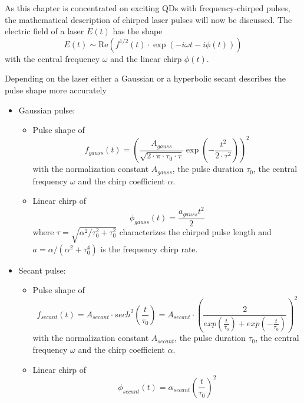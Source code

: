 As this chapter is concentrated on exciting \acp{QD} with frequency-chirped pulses, the mathematical description of chirped laser pulses will now be discussed. The electric field of a laser $E(t)$ has the shape
\begin{equation}
\label{eq:electric-field-laser}
E(t) \sim \mathrm{Re}\left(f^{1/2}(t) \cdot \exp\left(-i \omega t - i \phi(t)\right)\right)
\end{equation}
with the central frequency $\omega$ and the linear chirp $\phi(t)$.

Depending on the laser either a Gaussian or a hyperbolic secant describes the pulse shape more accurately~\cite{glassl_biexciton_2013, hirayama_real-time_2002}

\begin{itemize}
	\item Gaussian pulse:
	\begin{itemize}
		\item Pulse shape of
		\begin{equation}
		\label{eq:f_gauss}
		f_{gauss}(t) = \left(\frac{A_{gauss}}{\sqrt{2 \cdot \pi \cdot \tau_0 \cdot \tau}} \exp\left(-\frac{t^2}{2 \cdot \tau^2}\right)\right)^2
		\end{equation}
		with the normalization constant $A_{gauss}$, the pulse duration $\tau_0$, the central frequency $\omega$ and the chirp coefficient $\alpha$.
		\item Linear chirp of
		\begin{equation}
		\label{eq:phi-gauss}
		\phi_{gauss}(t) = \frac{a_{gauss} t^2}{2}
		\end{equation}
		where $\tau = \sqrt{\alpha^2 / \tau_0^2 + \tau_0^2}$ characterizes the chirped pulse length and $a = \alpha / (\alpha ^ 2 + \tau _0 ^ 4)$ is the frequency chirp rate.
	\end{itemize}
	\item Secant pulse:
	\begin{itemize}
		\item Pulse shape of
		\begin{equation}
		f_{secant}(t) = A_{secant} \cdot sech^2\left(\frac{t}{\tau_0}\right) = A_{secant} \cdot \left(\frac{2}{exp(\frac{t}{\tau_0}) + exp(-\frac{t}{\tau_0})}\right)^2
		\end{equation}
		with the normalization constant $A_{secant}$, the pulse duration $\tau_0$, the central frequency $\omega$ and the chirp coefficient $\alpha$.
		\item Linear chirp of
		\begin{equation}
		\phi_{secant}(t) = \alpha_{secant}\left(\frac{t}{\tau_0}\right)^2
		\end{equation}
	\end{itemize}
\end{itemize}

